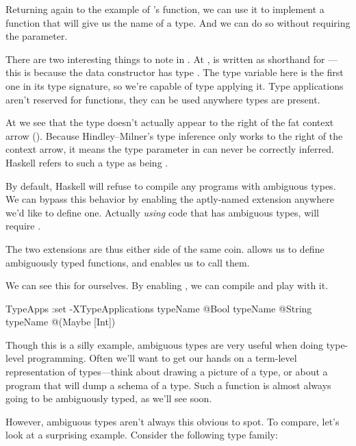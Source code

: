 \documentclass[book.tex]{subfiles}
\begin{document}
Returning again to the example of 's  function, we
can use it to implement a function that will give us the name of a type. And we
can do so without requiring the  parameter.


There are two interesting things to note in . At ,  is written as shorthand for ---this is because the
 data constructor has type . The type variable  here
is the first one in its type signature, so we're capable of type applying it.
Type applications aren't reserved for functions, they can be used anywhere types
are present.

At  we see that the type  doesn't actually appear to the right of
the fat context arrow (\hs{=>}). Because Hindley--Milner's type inference only
works to the right of the context arrow, it means the type parameter  in
 can never be correctly inferred. Haskell refers to such a type as
being .

By default, Haskell will refuse to compile any programs with ambiguous types. We
can bypass this behavior by enabling the aptly-named 
extension anywhere we'd like to define one. Actually \emph{using} code that has
ambiguous types, will require .

The two extensions are thus either side of the same coin.
 allows us to define ambiguously typed functions, and
 enables us to call them.

We can see this for ourselves. By enabling , we can
compile  and play with it.

\begin{dorepl}{TypeApps}
:set -XTypeApplications
typeName @Bool
typeName @String
typeName @(Maybe [Int])
\end{dorepl}

Though this is a silly example, ambiguous types are very useful when doing
type-level programming. Often we'll want to get our hands on a term-level
representation of types---think about drawing a picture of a type, or about a
program that will dump a schema of a type. Such a function is almost always
going to be ambiguously typed, as we'll see soon.

However, ambiguous types aren't always this obvious to spot. To compare, let's
look at a surprising example. Consider the following type family:
\end{document}
